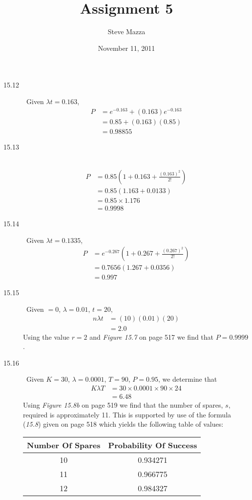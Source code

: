 \documentclass[letterpaper,10pt]{article}
\title{Assignment 5}
\author{Steve Mazza}
\date{November 11, 2011}
\begin{document}
\maketitle

\begin{description}
\item[15.12]\ Given $\lambda t=0.163$,
\begin{align*}
P &= e^{-0.163}+(0.163)e^{-0.163} \\
&= 0.85+(0.163)(0.85) \\
&= 0.98855
\end{align*}
\item[15.13]\ 
\begin{align*}
P &= 0.85\left( 1+0.163+\frac{(0.163)^{2}}{2!}\right) \\
&= 0.85(1.163+0.0133) \\
&= 0.85\times 1.176 \\
&= 0.9998
\end{align*}
\item[15.14]\ Given $\lambda t=0.1335$,
\begin{align*}
P &= e^{-0.267}\left( 1+0.267+\frac{(0.267)^{2}}{2!} \right) \\
&= 0.7656(1.267+0.0356) \\
&= 0.997
\end{align*}
\item[15.15]\ Given $=0$, $\lambda=0.01$, $t=20$,
\begin{align*}
n\lambda t &= (10)(0.01)(20) \\
&= 2.0
\end{align*}
Using the value $r=2$ and \emph{Figure 15.7} on page 517 we find that $P=0.9999$.
\item[15.16]\ Given $K=30$, $\lambda=0.0001$, $T=90$, $P=0.95$, we determine that
\begin{align*}
K\lambda T &= 30\times 0.0001\times 90\times 24 \\
&= 6.48
\end{align*}
Using \emph{Figure 15.8b} on page 519 we find that the number of spares, $s$, required is approximately 11.  This is supported by use of the formula (\emph{15.8}) given on page 518 which yields the following table of values:
\begin{table}[htdp]
\begin{center}
\begin{tabular}{cc}
\hline
Number Of Spares & Probability Of Success \\
\hline
10 & 0.934271 \\
11 & 0.966775 \\
12 & 0.984327 \\
\hline
\end{tabular}
\end{center}
\end{table}%

\end {description}
\end{document}
